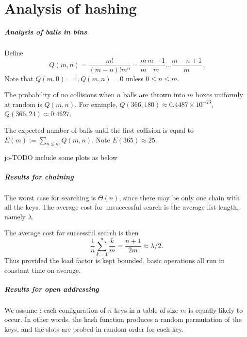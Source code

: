 \chapter{Analysis of hashing} %

\paragraph{Analysis of balls in bins}
Define 
$$Q(m, n) = \frac{m!}{(m-n)! m^n} = \frac{m}{m} \frac{m-1}{m} \dots 
\frac{m - n + 1}{m}.$$
Note that $Q(m,0) = 1, Q(m, n) = 0$ unless $0 \leq n \leq m$.

The probability of no collisions when $n$ balls are thrown into $m$ boxes 
uniformly at random is $Q(m, n)$. For example, $Q(366, 180) \approx 0.4487
 \times 10^{-23}$, $Q(366, 24) \approx  0.4627$. 

The expected number of balls until the first collision is equal to 
$E(m):=\sum_{n \leq m} Q(m, n)$. Note $E(365) \approx 25$.


jo-TODO include some plots as below
% 


\paragraph{Results for chaining}

The worst case for searching is $\Theta(n)$, since there may be only one 
chain with all the keys. The average cost for unsuccessful search is the average list length, 
namely $\lambda$.

The average cost for successful search is then 
$$
\frac{1}{n} \sum_{k=1}^n \frac{k}{m} = \frac{n+1}{2m} \approx \lambda/2.
$$
Thus provided the load factor is kept bounded, basic operations all run in 
constant time on average. 


\paragraph{Results for open addressing}

We assume : each configuration of 
$n$ keys in a table of size $m$ is equally likely to occur. In other words, the 
hash function produces a random permutation of the keys, and the slots are 
probed in random order for each key.

